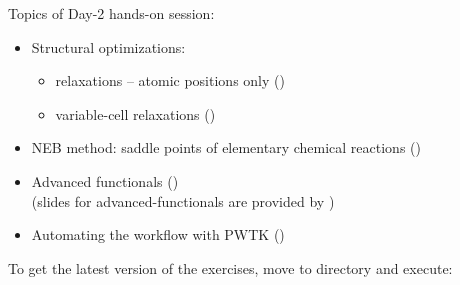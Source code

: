 \documentclass[landscape]{foils}
\begin{document}
Topics of Day-2 hands-on session:
\begin{itemize}
\item Structural optimizations:
  \begin{itemize}
  \item relaxations -- atomic positions only ()
  \item variable-cell relaxations ()
  \end{itemize}
\item NEB method: saddle points of elementary chemical
  reactions ()
\item Advanced functionals ()\\
  (slides for advanced-functionals are provided by )
\item Automating the workflow with PWTK
  ()\\
\end{itemize}

\vspace{-0.5em}
To get the
latest version of the exercises, move to  directory and execute:\\[0.5em]

\rightheader{}
\end{document}
